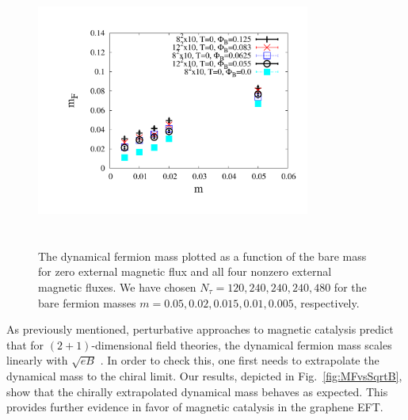 \documentclass[aps,prd,twocolumn,showpacs,superscriptaddress,groupedaddress]{revtex4}  %
\begin{document}
\begin{figure}
\vspace{-1.2cm}
  \includegraphics[height=9cm,width=9cm]{ferm_mt_vs_m_graphene_paper.pdf} 
  \vspace{-1.25cm}
\caption{The dynamical fermion mass plotted as a function of the bare mass for zero external magnetic flux and all four nonzero external magnetic fluxes. We have chosen $N_{\tau}=120,240,240,240,480$ for the bare fermion masses $m=0.05,0.02,0.015,0.01,0.005$, respectively.}
\label{MFvsmNonzeroB}
\end{figure}

As previously mentioned, perturbative approaches to magnetic catalysis predict that for $(2+1)$-dimensional field theories, the dynamical fermion mass scales linearly with $\sqrt{eB}$ \cite{Shovkovy}. In order to check this, one first needs to extrapolate the dynamical mass to the chiral limit. Our results, depicted in Fig.~\ref{fig:MFvsSqrtB}, show that the chirally extrapolated dynamical mass behaves as expected. This provides further evidence in favor of magnetic catalysis in the graphene EFT.
\end{document}
